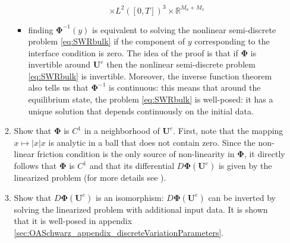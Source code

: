 \begin{enumerate}
\begin{enumerate}
\begin{itemize}
\begin{equation}
 			\times L^2([0,T])^{3}
			\times \mathbb{R}^{M_a+M_o}
 	\end{equation}
\item 
finding $\mathbf{\Phi}^{-1}(y)$ is equivalent
to solving the nonlinear semi-discrete problem
\eqref{eq:SWRbulk} if the component of $y$ corresponding
to the interface condition is zero.
The idea of the proof is that if $\mathbf{\Phi}$ is invertible
around $\mathbf{U}^e$ then the nonlinear semi-discrete problem
\eqref{eq:SWRbulk} is invertible.
Moreover, the inverse function theorem also tells us that
$\mathbf{\Phi}^{-1}$ is  continuous:
this means that around
the equilibrium state, the problem \eqref{eq:SWRbulk} is well-posed:
it has a unique solution that depends continuously
on the initial data.
\end{itemize}
		\item Show that $\mathbf{\Phi}$ is $C^1$ in a
			neighborhood of $\mathbf{U}^e$.
			First, note that the mapping
			$x \mapsto |x|x$ is analytic in a
			ball that does not contain zero.
			Since the non-linear friction condition
			is the only source of
			non-linearity in $\mathbf{\Phi}$,
			it directly follows that
			$\mathbf{\Phi}$ is $C^1$ and that
			its differential
			$D\mathbf{\Phi}(\mathbf{U}^e)$ is given
			by the linearized problem (for more
			details see
			\cite{chacon-rebollo_existence_2014}).
		\item Show that $D\mathbf{\Phi}(\mathbf{U}^e)$
		is an isomorphism:
		$D\mathbf{\Phi}(\mathbf{U}^e)$ can
		be inverted by solving the linearized problem
		with additional input data.
		It is  shown
		that it is well-posed in appendix
		\ref{sec:OASchwarz_appendix_discreteVariationParameters}.
	\end{enumerate}
\end{enumerate}

